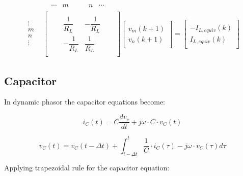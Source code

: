 \begin{equation}
\begin{split}
	&
	\begin{matrix}
		& \cdots & m & \quad \quad n & \cdots
	\end{matrix}\\[-6pt]
	\begin{matrix}
		\vdots\\[6pt]
		m\\[6pt]
		n\\[6pt]
		\vdots\\
	\end{matrix}
	&
	\begin{bmatrix}
		\quad & \quad & \\[6pt]
		\quad & \dfrac{1}{R_L} & -\dfrac{1}{R_L} & \quad \\[6pt]
		\quad & -\dfrac{1}{R_L} & \dfrac{1}{R_L} & \quad \\[6pt]
		\quad &  & 
	\end{bmatrix}
	\begin{bmatrix}
		\quad \\[6pt]
		v_m(k+1)\\[6pt]
		v_n(k+1)\\[6pt]
		\quad
	\end{bmatrix}
	=
	\begin{bmatrix}
		\quad \\[6pt]
		-I_{L,equiv}(k)\\[6pt]
		I_{L,equiv}(k)\\[6pt]
		\quad
	\end{bmatrix}
\end{split}
\end{equation}

\subsection{Capacitor}

In dynamic phasor the capacitor equations become:

\begin{equation}
        i_C(t)= C \frac{d v_c}{dt} + j \omega \cdot C \cdot v_C(t)
\end{equation}

\begin{equation}
        v_C(t) = v_C(t- \Delta t) +  \int_{t- \Delta t}^{t} \frac{1}{C} \cdot i_C(\tau) -j \omega \cdot v_C(\tau)d \tau 
\end{equation}

Applying trapezoidal rule for the capacitor equation:

